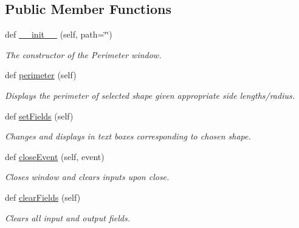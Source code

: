 \subsection*{Public Member Functions}
\begin{DoxyCompactItemize}
\item 
def \hyperlink{classperimeter__ui_1_1_perimeter_window_aa763b2caa5f3425d4666e237a58c1dc3}{\+\_\+\+\_\+init\+\_\+\+\_\+} (self, path=\char`\"{}\char`\"{})
\begin{DoxyCompactList}\small\item\em The constructor of the Perimeter window. \end{DoxyCompactList}\item 
def \hyperlink{classperimeter__ui_1_1_perimeter_window_afdeb1c9d24171741ae3077eaa4e2070d}{perimeter} (self)
\begin{DoxyCompactList}\small\item\em Displays the perimeter of selected shape given appropriate side lengths/radius. \end{DoxyCompactList}\item 
\mbox{\label{classperimeter__ui_1_1_perimeter_window_a81461f899e536b3dc57a8bfda6f3ba01}} 
def \hyperlink{classperimeter__ui_1_1_perimeter_window_a81461f899e536b3dc57a8bfda6f3ba01}{set\+Fields} (self)
\begin{DoxyCompactList}\small\item\em Changes and displays in text boxes corresponding to chosen shape. \end{DoxyCompactList}\item 
\mbox{\label{classperimeter__ui_1_1_perimeter_window_a2e9715796974be96bdf58f6b9235e95f}} 
def \hyperlink{classperimeter__ui_1_1_perimeter_window_a2e9715796974be96bdf58f6b9235e95f}{close\+Event} (self, event)
\begin{DoxyCompactList}\small\item\em Closes window and clears inputs upon close. \end{DoxyCompactList}\item 
\mbox{\label{classperimeter__ui_1_1_perimeter_window_a19139d947ed5061dc53a29f1272fc51d}} 
def \hyperlink{classperimeter__ui_1_1_perimeter_window_a19139d947ed5061dc53a29f1272fc51d}{clear\+Fields} (self)
\begin{DoxyCompactList}\small\item\em Clears all input and output fields. \end{DoxyCompactList}\end{DoxyCompactItemize}
